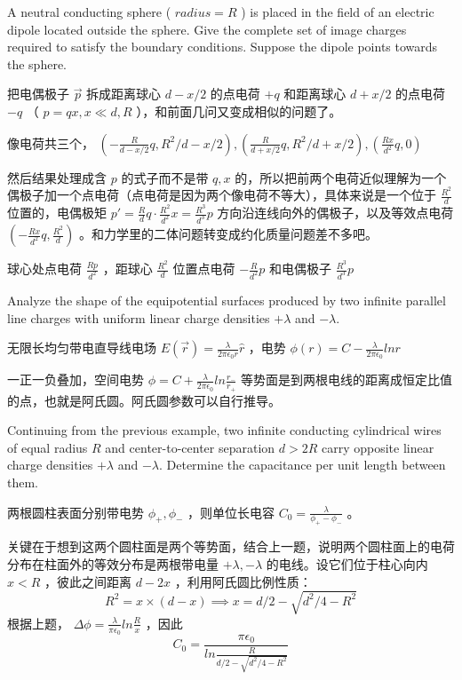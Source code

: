 \begin{solution}
    A neutral conducting sphere ( \(radius = R\) ) is placed in the field of an electric dipole located outside the sphere. Give the complete set of image charges required to satisfy the boundary conditions. Suppose the dipole points towards the sphere.
\tcbrule

    把电偶极子 \(\vec{p}\) 拆成距离球心 \(d-x/2\) 的点电荷 \(+q\) 和距离球心 \(d+x/2\) 的点电荷 \(-q\) （ \(p=qx,x\ll d,R\) ），和前面几问又变成相似的问题了。

    像电荷共三个， \((-\frac{R}{d-x/2}q,R^2/{d-x/2}),(\frac{R}{d+x/2}q,R^2/{d+x/2}),(\frac{Rx}{d^2}q,0)\) 

    然后结果处理成含 \(p\) 的式子而不是带 \(q,x\) 的，所以把前两个电荷近似理解为一个偶极子加一个点电荷（点电荷是因为两个像电荷不等大），具体来说是一个位于 \(\frac{R^2}{d}\) 位置的，电偶极矩 \(p'=\frac{R}{d} q \cdot \frac{R^2}{d^2}x=\frac{R^3}{d^3}p\) 方向沿连线向外的偶极子，以及等效点电荷 \((-\frac{Rx}{d^2}q,\frac{R^2}{d})\) 。和力学里的二体问题转变成约化质量问题差不多吧。

    球心处点电荷 \(\frac{Rp}{d^2}\) ，距球心 \(\frac{R^2}{d}\) 位置点电荷 \(-\frac{R}{d^2}p\) 和电偶极子 \(\frac{R^3}{d^3}p\)
\end{solution}

\begin{solution}
    Analyze the shape of the equipotential surfaces produced by two infinite parallel line charges with uniform linear charge densities \(+\lambda\) and \(-\lambda\).
\tcbrule

    无限长均匀带电直导线电场 \(E(\vec{r})=\frac{\lambda}{2\pi \epsilon_0 r}\hat{r}\) ，电势 \(\phi(r)=C-\frac{\lambda}{2\pi \epsilon_0}ln r\)

    一正一负叠加，空间电势 \(\phi=C+\frac{\lambda}{2\pi \epsilon_0}ln\frac{r_-}{r_+}\) 等势面是到两根电线的距离成恒定比值的点，也就是阿氏圆。阿氏圆参数可以自行推导。
\end{solution}

\begin{solution}
    Continuing from the previous example, two infinite conducting cylindrical wires of equal radius \(R\) and center-to-center separation \(d>2R\) carry opposite linear charge densities \(+\lambda\) and \(-\lambda\). Determine the capacitance per unit length between them.
\tcbrule

    两根圆柱表面分别带电势 \(\phi_+,\phi_-\) ，则单位长电容 \(C_0=\frac{\lambda}{\phi_+-\phi_-}\) 。
    
    关键在于想到这两个圆柱面是两个等势面，结合上一题，说明两个圆柱面上的电荷分布在柱面外的等效分布是两根带电量 \(+\lambda,-\lambda\) 的电线。设它们位于柱心向内 \(x<R\) ，彼此之间距离 \(d-2x\) ，利用阿氏圆比例性质：
    \[
        R^2 = x \times (d-x) \implies x = d/2 - \sqrt{d^2/4-R^2}
    \]
    根据上题， \(\Delta \phi = \frac{\lambda}{\pi \epsilon_0}ln \frac{R}{x}\) ，因此
    \[
        C_0=\frac{\pi\epsilon_0}{ln\frac{R}{d/2-\sqrt{d^2/4-R^2}}}
    \]
\end{solution}